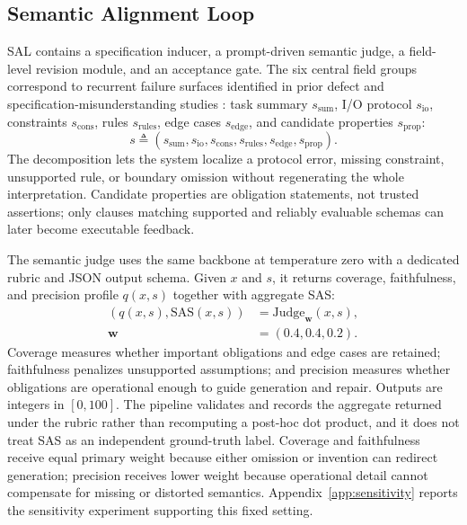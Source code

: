 \subsection{Semantic Alignment Loop}

SAL contains a specification inducer, a prompt-driven semantic judge, a field-level revision module, and an acceptance gate. The six central field groups correspond to recurrent failure surfaces identified in prior defect and specification-misunderstanding studies \citep{ref_bug_study,ref_codegen_error_taxonomy,ref_mufix,ref_pseudoeval}: task summary $s_{\mathrm{sum}}$, I/O protocol $s_{\mathrm{io}}$, constraints $s_{\mathrm{cons}}$, rules $s_{\mathrm{rules}}$, edge cases $s_{\mathrm{edge}}$, and candidate properties $s_{\mathrm{prop}}$:
\begin{equation}
s\triangleq(s_{\mathrm{sum}},s_{\mathrm{io}},s_{\mathrm{cons}},s_{\mathrm{rules}},s_{\mathrm{edge}},s_{\mathrm{prop}}).
\label{eq:spec}
\end{equation}
The decomposition lets the system localize a protocol error, missing constraint, unsupported rule, or boundary omission without regenerating the whole interpretation. Candidate properties are obligation statements, not trusted assertions; only clauses matching supported and reliably evaluable schemas can later become executable feedback.

The semantic judge uses the same backbone at temperature zero with a dedicated rubric and JSON output schema. Given $x$ and $s$, it returns coverage, faithfulness, and precision profile $q(x,s)$ together with aggregate SAS:
\begin{equation}
\begin{aligned}
(q(x,s),\mathrm{SAS}(x,s))&=\mathrm{Judge}_{\mathbf w}(x,s),\\
\mathbf w&=(0.4,0.4,0.2).
\end{aligned}
\label{eq:sas}
\end{equation}
Coverage measures whether important obligations and edge cases are retained; faithfulness penalizes unsupported assumptions; and precision measures whether obligations are operational enough to guide generation and repair. Outputs are integers in $[0,100]$. The pipeline validates and records the aggregate returned under the rubric rather than recomputing a post-hoc dot product, and it does not treat SAS as an independent ground-truth label. Coverage and faithfulness receive equal primary weight because either omission or invention can redirect generation; precision receives lower weight because operational detail cannot compensate for missing or distorted semantics. Appendix~\ref{app:sensitivity} reports the sensitivity experiment supporting this fixed setting.

